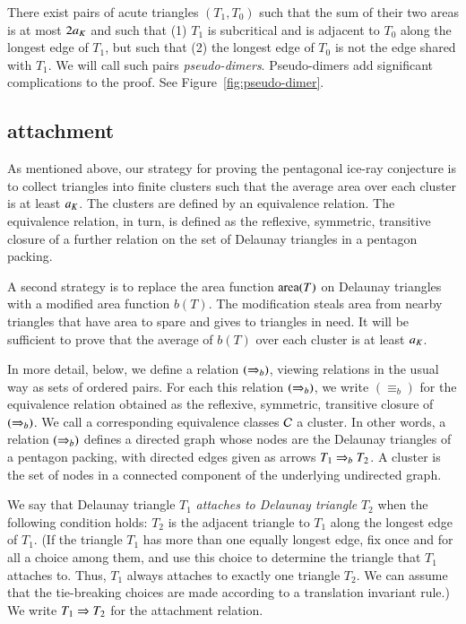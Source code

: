 
\begin{example} There exist pairs of acute triangles $(T_1,T_0)$ such that the sum of their two areas
 is at most $2a_K$ and such that (1) $T_1$ is subcritical and is adjacent to $T_0$ 
along the longest edge of $T_1$, but such that (2) the longest edge of $T_0$ is 
not the edge shared with $T_1$.  We will call such pairs {\it pseudo-dimers}.
 Pseudo-dimers add significant complications to the proof.
See Figure~\ref{fig:pseudo-dimer}.
\end{example}


\subsection{attachment}

As mentioned above, our strategy for proving the pentagonal ice-ray conjecture
is to collect triangles into finite clusters such that the average
area over each cluster is at least $a_K$.  The clusters are defined by
an  equivalence relation.  The equivalence relation, in turn,
is defined as the reflexive, symmetric, transitive closure of a further
relation on the set of Delaunay triangles in a pentagon packing.

A second strategy is to replace the area function ${\operatorname{area}}(T)$ on Delaunay
triangles with a modified area function $b(T)$.  The modification steals area from
nearby triangles that have area to spare and gives to triangles in need.  It will 
be sufficient to prove that the average of $b(T)$ over each cluster is at least $a_K$.


In more detail, below, we define a  relation $(\Rightarrow_{b})$, viewing
relations in the usual way as sets of ordered pairs.  For each
this relation $(\Rightarrow_{b})$, we write ${(\equiv_{b})}$ for the equivalence
relation obtained as the reflexive, symmetric, transitive closure of
$(\Rightarrow_{b})$.  We call a corresponding equivalence classes $\mathcal C$ a
cluster.  In other words, a relation $(\Rightarrow_{b})$ defines a directed
graph whose nodes are the Delaunay triangles of a pentagon packing,
with directed edges given as arrows $T_1\Rightarrow_{b} T_2$.  A cluster
is the set of nodes in a connected component of the underlying
undirected graph.

We say that Delaunay triangle $T_1$ {\it attaches to Delaunay
  triangle} $T_2$ when  the following condition holds: $T_2$
is the adjacent triangle to $T_1$ along the longest edge of $T_1$.
(If the triangle $T_1$ has more than one equally longest edge, fix
once and for all a choice among them, and use this choice to determine
the triangle that $T_1$ attaches to.  Thus, $T_1$ always attaches to
exactly one triangle $T_2$.  We can assume that the tie-breaking
choices are made according to a translation invariant rule.)  We write
$T_1 \Rightarrow T_2$ for the attachment relation.


